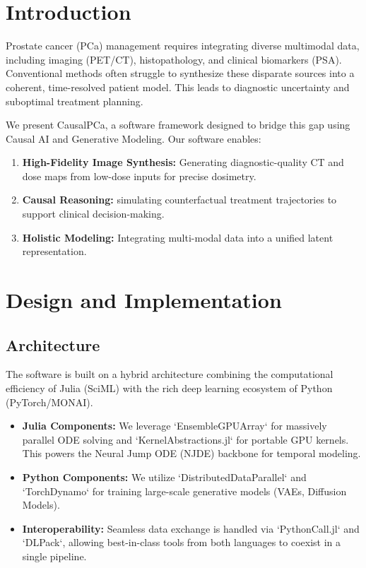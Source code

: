 \documentclass[10pt,letterpaper]{article}
\begin{document}
\linenumbers

\section*{Introduction}
Prostate cancer (PCa) management requires integrating diverse multimodal data, including imaging (PET/CT), histopathology, and clinical biomarkers (PSA). Conventional methods often struggle to synthesize these disparate sources into a coherent, time-resolved patient model. This leads to diagnostic uncertainty and suboptimal treatment planning.

We present CausalPCa, a software framework designed to bridge this gap using Causal AI and Generative Modeling. Our software enables:
\begin{enumerate}
    \item \textbf{High-Fidelity Image Synthesis:} Generating diagnostic-quality CT and dose maps from low-dose inputs for precise dosimetry.
    \item \textbf{Causal Reasoning:} simulating counterfactual treatment trajectories to support clinical decision-making.
    \item \textbf{Holistic Modeling:} Integrating multi-modal data into a unified latent representation.
\end{enumerate}

\section*{Design and Implementation}

\subsection*{Architecture}
The software is built on a hybrid architecture combining the computational efficiency of Julia (SciML) with the rich deep learning ecosystem of Python (PyTorch/MONAI).
\begin{itemize}
    \item \textbf{Julia Components:} We leverage `EnsembleGPUArray` for massively parallel ODE solving and `KernelAbstractions.jl` for portable GPU kernels. This powers the Neural Jump ODE (NJDE) backbone for temporal modeling.
    \item \textbf{Python Components:} We utilize `DistributedDataParallel` and `TorchDynamo` for training large-scale generative models (VAEs, Diffusion Models).
    \item \textbf{Interoperability:} Seamless data exchange is handled via `PythonCall.jl` and `DLPack`, allowing best-in-class tools from both languages to coexist in a single pipeline.
\end{itemize}
\end{document}
